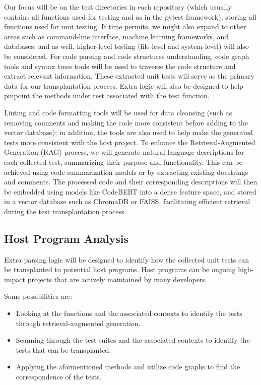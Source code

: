 \documentclass[sigconf]{acmart}
\begin{document}
%
Our focus will be on the test directories in each repository (which usually contains all functions used for testing and as in the pytest framework), storing all functions used for unit testing.
%
If time permits, we might also expand to other areas such as command-line interface, machine learning frameworks, and databases; and as well, higher-level testing (file-level and system-level) will also be considered.
%
For code parsing and code structures understanding, code graph tools and syntax trees tools will be used to traverse the code structure and extract relevant information.
%
These extracted unit tests will serve as the primary data for our transplantation process. Extra logic will also be designed to help pinpoint the methods under test associated with the test function.

%
Linting and code formatting tools will be used for data cleansing (such as removing comments and making the code more consistent before adding to the vector database); in addition, the tools are also used to help make the generated tests more consistent with the host project.
%
To enhance the Retrieval-Augmented Generation (RAG) process, we will generate natural language descriptions for each collected test, summarizing their purpose and functionality. This can be achieved using code summarization models or by extracting existing docstrings and comments.
%
The processed code and their corresponding descriptions will then be embedded using models like CodeBERT into a dense feature space, and stored in a vector database such as ChromaDB or FAISS, facilitating efficient retrieval during the test transplantation process.


\subsection{Host Program Analysis}
Extra parsing logic will be designed to identify how the collected unit tests can be transplanted to potential host programs. Host programs can be ongoing high-impact projects that are actively maintained by many developers.

Some possibilities are:
\begin{itemize}
\item Looking at the functions and the associated contexts to identify the tests through retrieval-augmented generation.
\item Scanning through the test suites and the associated contexts to identify the tests that can be transplanted.
\item Applying the aformentioned methods and utilize code graphs to find the correspondence of the tests.
\end{itemize}
\end{document}
